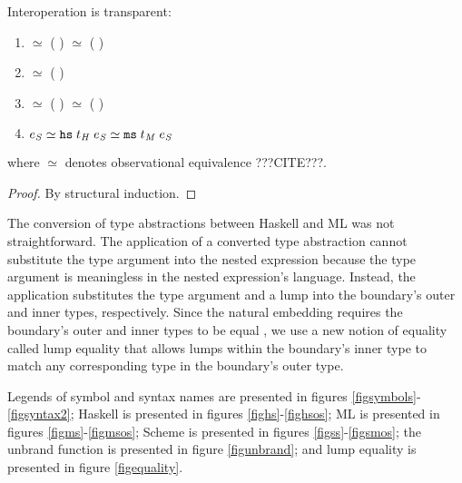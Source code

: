\begin{theorem}{Interoperation is transparent:}
\label{thmtransparent}
\begin{enumerate}
\item
\varexph
$\simeq$
\exphm
{
	\vartyh
}
{
	\vartym
}
{
	(
	\expmh
	{
		\vartym
	}
	{
		\vartyh
	}
	{
		\varexph
	}
	)
}
$\simeq$
\expms
{
	\vartym
}
{
	(
	\expsh
	{
		\vartyh
	}
	{
		\varexph
	}
	)
}
\item
$\simeq$
\exphs
{
	\vartyh
}
{
	(
	\expsh
	{
		\vartyh
	}
	{
		\varexph
	}
	)
}
\item
\varexpm
$\simeq$
\expmh
{
	\vartym
}
{
	\vartyh
}
{
	(
	\exphm
	{
		\vartyh
	}
	{
		\vartym
	}
	{
		\varexpm
	}
	)
}
$\simeq$
\expms
{
	\vartym
}
{
	(
	\expsm
	{
		\vartym
	}
	{
		\varexpm
	}
	)
}
\item $e_{\mathit{S}} \simeq \mathtt{hs} \; t_{\mathit{H}} \; e_{\mathit{S}} \simeq \mathtt{ms} \; t_{\mathit{M}} \; e_{\mathit{S}}$
\end{enumerate}
where $\simeq$ denotes observational equivalence ???CITE???.
\begin{proof}
By structural induction.
\end{proof}
\end{theorem}

The conversion of type abstractions between Haskell and ML was not straightforward. The application of a converted type abstraction cannot substitute the type argument into the nested expression because the type argument is meaningless in the nested expression's language. Instead, the application substitutes the type argument and a lump into the boundary's outer and inner types, respectively. Since the natural embedding requires the boundary's outer and inner types to be equal \cite{matthews07}, we use a new notion of equality called lump equality that allows lumps within the boundary's inner type to match any corresponding type in the boundary's outer type.

Legends of symbol and syntax names are presented in figures \ref{figsymbols}-\ref{figsyntax2}; Haskell is presented in figures \ref{fighs}-\ref{fighsos}; ML is presented in figures \ref{figms}-\ref{figmsos}; Scheme is presented in figures \ref{figss}-\ref{figsmos}; the unbrand function is presented in figure \ref{figunbrand}; and lump equality is presented in figure \ref{figequality}.

\clearpage



\clearpage



